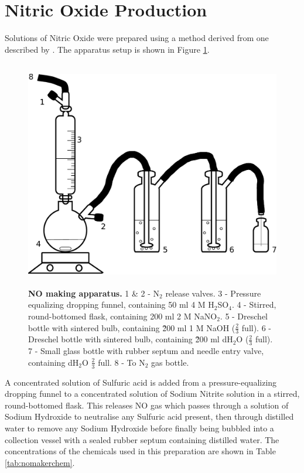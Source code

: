 \section{Nitric Oxide Production}
Solutions of Nitric Oxide were prepared using a method derived from one described by \citet{Aga2008}. The apparatus setup is shown in Figure \ref{fig:nomaker}. 
\begin{figure}
 \centering
 \includegraphics[height=10cm]{./02-materialsmethods/data/drawing.pdf}
 \caption[NO making apparatus.]{{\bf NO making apparatus.} 1 \& 2 - N$_{\textrm{2}}$ release valves. 3 - Pressure equalizing dropping funnel, containing 50 ml 4 M H$_{\textrm{2}}$SO$_{\textrm{4}}$. 4 - Stirred, round-bottomed flask, containing 200 ml 2 M NaNO$_{\textrm{2}}$. 5 - Dreschel bottle with sintered bulb, containing \~200 ml 1 M NaOH ($\frac{2}{3}$ full). 6 - Dreschel bottle with sintered bulb, containing \~200 ml dH$_{\textrm{2}}$O ($\frac{2}{3}$ full). 7 - Small glass bottle with rubber septum and needle entry valve, containing dH$_{\textrm{2}}$O $\frac{2}{3}$ full. 8 - To N$_{\textrm{2}}$ gas bottle.
 \label{fig:nomaker}}
\end{figure}
A concentrated solution of Sulfuric acid is added from a pressure-equalizing dropping funnel to a concentrated solution of Sodium Nitrite solution in a stirred, round-bottomed flask. This releases NO gas which passes through a solution of Sodium Hydroxide to neutralise any Sulfuric acid present, then through distilled water to remove any Sodium Hydroxide before finally being bubbled into a collection vessel with a sealed rubber septum containing distilled water. The concentrations of the chemicals used in this preparation are shown in Table \ref{tab:nomakerchem}.
